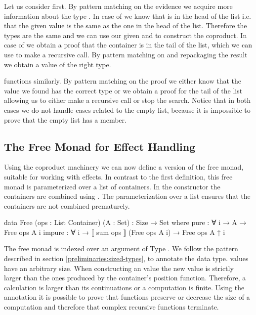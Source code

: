 Let us consider  first.
By pattern matching on the evidence we acquire more information about the type
\AgdaSpace{}.
In case of  we know that  is in
the head of the list i.e. that the given value 
is the same as the one in the head of the list.
Therefore the  types are the same and we can use our given
 and  to construct the coproduct.
In case of  we obtain a proof that the container
is in the tail of the list, which we can use to make a recursive call.
By pattern matching on and repackaging the result we obtain a value of the right
type.

 functions similarly.
By pattern matching on the proof we either know that the value we found has
the correct type or we obtain a proof for the tail of the list allowing us to
either make a recursive call or stop the search.
Notice that in both cases we do not handle cases related to the empty list,
because it is impossible to prove that the empty list has a member.


\subsection{The Free Monad for Effect Handling}
\label{first-order:free-monad}

Using the coproduct machinery we can now define a version of the free monad,
suitable for working with effects.
In contrast to the first definition, this free monad is parameterized over a
list of containers.
In the  constructor the containers are combined
using .
The parameterization over a list ensures that the containers are not combined
prematurely.

\begin{code}
data Free (ops : List Container) (A : Set) : {Size} → Set where
  pure    : ∀ {i} → A → Free ops A {i}
  impure  : ∀ {i} → ⟦ sum ops ⟧ (Free ops A {i}) → Free ops A {↑ i}
\end{code}
The free monad is indexed over an argument of Type .
We follow the pattern described in section \ref{preliminaries:sized-types}, to
annotate the data type.
 values have an arbitrary size.
When constructing an  value the new value is
strictly larger than the ones produced by the container's position function.
Therefore, a calculation is larger than its continuations or a computation is
finite.
Using the annotation it is possible to prove that functions preserve or decrease
the size of a computation and therefore that complex recursive functions
terminate.

